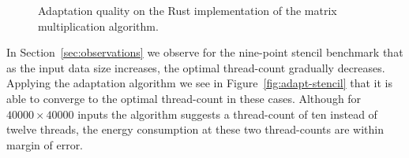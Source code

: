 \documentclass[runningheads]{llncs}
\begin{document}
\begin{figure}[!t]
  \centering
  \tiny
  \captionsetup{width=.45\linewidth}
  \begin{minipage}{.5\linewidth}
    \centering
    \caption{Adaptation quality on the SaC implementation of the nine-point stencil operation.}%
    \label{fig:adapt-stencil}
  \end{minipage}%
  \begin{minipage}{.5\linewidth}
    \centering
    \caption{Adaptation quality on the Rust implementation of the matrix multiplication algorithm.}%
    \label{fig:adapt-rust}
  \end{minipage}%
\end{figure}

In Section~\ref{sec:observations} we observe for the nine-point stencil benchmark that as the input data size increases, the optimal thread-count gradually decreases.
Applying the adaptation algorithm we see in Figure~\ref{fig:adapt-stencil} that it is able to converge to the optimal thread-count in these cases.
Although for $40000 \times 40000$ inputs the algorithm suggests a thread-count of ten instead of twelve threads, the energy consumption at these two thread-counts are within margin of error.
\end{document}
